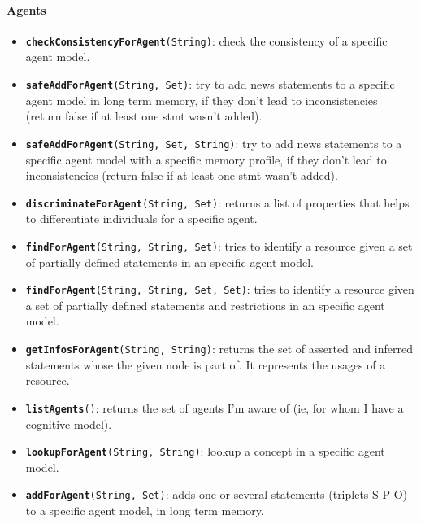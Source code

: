 \paragraph{Agents}
\begin{itemize}

    \item {\tt {\bf checkConsistencyForAgent}(String)}: check the consistency
    of a specific agent model.

    \item {\tt {\bf safeAddForAgent}(String, Set)}: try to add news statements
    to a specific agent model in long term memory, if they don't lead to
    inconsistencies (return false if at least one stmt wasn't added).

    \item {\tt {\bf safeAddForAgent}(String, Set, String)}: try to add news
    statements to a specific agent model with a specific memory profile, if
    they don't lead to inconsistencies (return false if at least one stmt
    wasn't added).

    \item {\tt {\bf discriminateForAgent}(String, Set)}: returns a list of
    properties that helps to differentiate individuals for a specific agent.

    \item {\tt {\bf findForAgent}(String, String, Set)}: tries to identify a
    resource given a set of partially defined statements in an specific agent
    model.

    \item {\tt {\bf findForAgent}(String, String, Set, Set)}: tries to identify
    a resource given a set of partially defined statements and restrictions in
    an specific agent model.

    \item {\tt {\bf getInfosForAgent}(String, String)}: returns the set of
    asserted and inferred statements whose the given node is part of. It
    represents the usages of a resource.

    \item {\tt {\bf listAgents}()}: returns the set of agents I'm aware of (ie,
    for whom I have a cognitive model).

    \item {\tt {\bf lookupForAgent}(String, String)}: lookup a concept in a
    specific agent model.

    \item {\tt {\bf addForAgent}(String, Set)}: adds one or several statements
    (triplets S-P-O) to a specific agent model, in long term memory.


\end{itemize}
